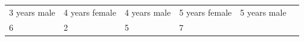 \begin{enumerate}[noitemsep, label=\textbf{\arabic*}. ]
{\begin{tabular}[t]{|l|l|l|l|l|l|}
    
        3 years male &
    
    
        4 years female &
    
    
        4
years male &
    
    
        5 years female &
    
    
        5 years male%
     \tabularnewline\cline{1-1}\cline{2-2}\cline{3-3}\cline{4-4}\cline{5-5}\cline{6-6}
    
    
        6 &
    
    
        2 &
    
    
        5 &
    
    
        7 &
    

\end{tabular}}
\end{enumerate}
